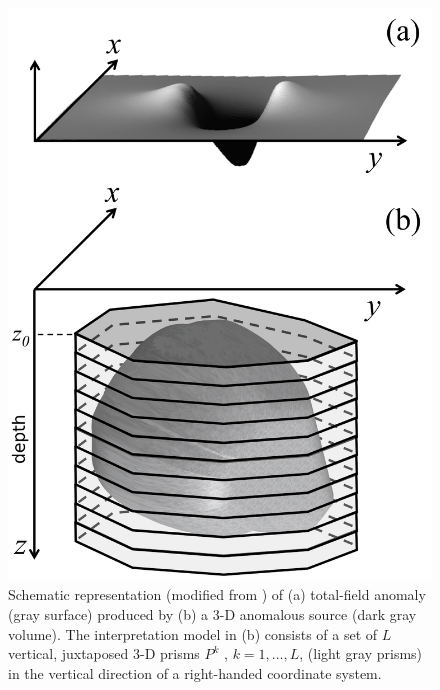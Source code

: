 
\begin{figure}
    \centering
    \includegraphics[scale=1]{figures/observed_data.png}
    \caption{Schematic representation (modified from \cite{oliveirajr-barbosa2013}) of (a) total-field anomaly (gray surface) produced by (b) a 3-D anomalous source (dark gray volume). The interpretation model in (b) consists of a set of $L$ vertical, juxtaposed 3-D prisms $P^k$ , $k = 1,\dots, L$, (light gray prisms) in the vertical direction of a right-handed coordinate system.}
    \label{fig:obs}
\end{figure}

